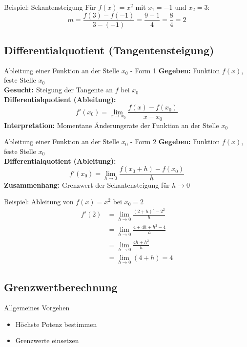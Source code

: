 \documentclass[a4paper,fontsize = 7pt]{scrartcl}
\begin{document}
\begin{subbox}{Beispiel: Sekantensteigung}
	Für $f(x) = x^2$ mit $x_1 = -1$ und $x_2 = 3$:
	$$m = \frac{f(3) - f(-1)}{3 - (-1)} = \frac{9 - 1}{4} = \frac{8}{4} = 2$$
\end{subbox}

\subsection{Differentialquotient (Tangentensteigung)}

\begin{mainbox}{Ableitung einer Funktion an der Stelle $x_0$ - Form 1}
	\textbf{Gegeben:} Funktion $f(x)$, feste Stelle $x_0$ \\
	\textbf{Gesucht:} Steigung der Tangente an $f$ bei $x_0$ \\
	\textbf{Differentialquotient (Ableitung):}
	$$f'(x_0) = \lim_{x \to x_0} \frac{f(x) - f(x_0)}{x - x_0}$$
	\textbf{Interpretation:} Momentane Änderungsrate der Funktion an der Stelle $x_0$
\end{mainbox}

\begin{mainbox}{Ableitung einer Funktion an der Stelle $x_0$ - Form 2}
	\textbf{Gegeben:} Funktion $f(x)$, feste Stelle $x_0$ \\
	\textbf{Differentialquotient (Ableitung):}
	$$f'(x_0) = \lim_{h \to 0} \frac{f(x_0 + h) - f(x_0)}{h}$$
	\textbf{Zusammenhang:} Grenzwert der Sekantensteigung für $h \to 0$
\end{mainbox}

\begin{subbox}{Beispiel: Ableitung von $f(x) = x^2$ bei $x_0 = 2$}
	\begin{align*}
		f'(2) &= \lim_{h \to 0} \frac{(2+h)^2 - 2^2}{h} \\
		&= \lim_{h \to 0} \frac{4 + 4h + h^2 - 4}{h} \\
		&= \lim_{h \to 0} \frac{4h + h^2}{h} \\
		&= \lim_{h \to 0} (4 + h) = 4
	\end{align*}
\end{subbox}

\subsection{Grenzwertberechnung}

\begin{mainbox}{Allgemeines Vorgehen}
    \begin{itemize}
        \item Höchste Potenz bestimmen
        \item Grenzwerte einsetzen
    \end{itemize}
\end{mainbox}
\end{document}
